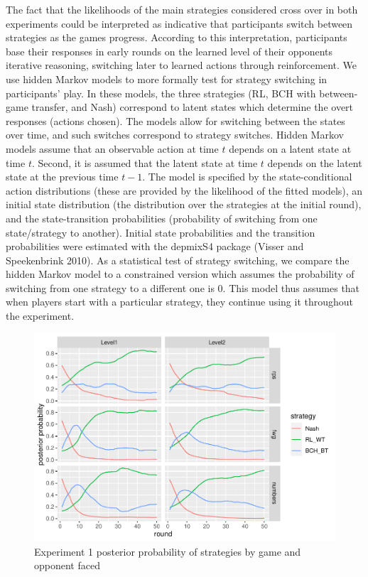 \documentclass[smallextended]{svjour3}       %
\begin{document}
The fact that the likelihoods of the main strategies considered cross
over in both experiments could be interpreted as indicative that
participants switch between strategies as the games progress. According
to this interpretation, participants base their responses in early
rounds on the learned level of their opponents iterative reasoning,
switching later to learned actions through reinforcement. We use hidden
Markov models to more formally test for strategy switching in
participants' play. In these models, the three strategies (RL, BCH with
between-game transfer, and Nash) correspond to latent states which
determine the overt responses (actions chosen). The models allow for
switching between the states over time, and such switches correspond to
strategy switches. Hidden Markov models assume that an observable action
at time \(t\) depends on a latent state at time \(t\). Second, it is
assumed that the latent state at time \(t\) depends on the latent state
at the previous time \(t-1\). The model is specified by the
state-conditional action distributions (these are provided by the
likelihood of the fitted models), an initial state distribution (the
distribution over the strategies at the initial round), and the
state-transition probabilities (probability of switching from one
state/strategy to another). Initial state probabilities and the
transition probabilities were estimated with the depmixS4 package
(Visser and Speekenbrink 2010). As a statistical test of strategy
switching, we compare the hidden Markov model to a constrained version
which assumes the probability of switching from one strategy to a
different one is 0. This model thus assumes that when players start with
a particular strategy, they continue using it throughout the experiment.

\begin{figure}

{\centering \includegraphics[width=\textwidth]{CBB_files/figure-latex/exp1-posteriors-plot-1} 

}

\caption{Experiment 1 posterior probability of strategies by game and opponent faced}\label{fig:exp1-posteriors-plot}
\end{figure}
\end{document}
